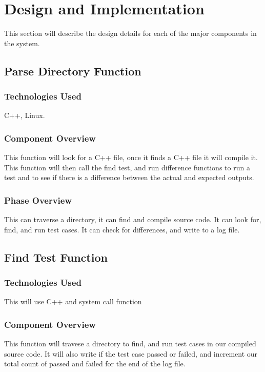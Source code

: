 \chapter{Design  and Implementation}
This section will describe the design details for each of the major components 
in the system. 
 

\section{Parse Directory Function}

\subsection{Technologies  Used}
C++, Linux.

\subsection{Component  Overview}
This function will look for a C++ file, once it finds a C++ file it will compile it. 
This function will then call the find test, and run difference functions to run a test
and to see if there is a difference between the actual and expected outputs.

\subsection{Phase Overview}
This can traverse a directory, it can find and compile source code. It can look for, find, 
and run test cases. It can check for differences, and write to a log file.



\section{Find Test Function}

\subsection{Technologies  Used}
This will use C++ and system call function

\subsection{Component  Overview}
This function will travese a directory to find, and run test cases in our compiled 
source code. It will also write if the test case passed or failed, and increment our 
total count of passed and failed for the end of the log file.

